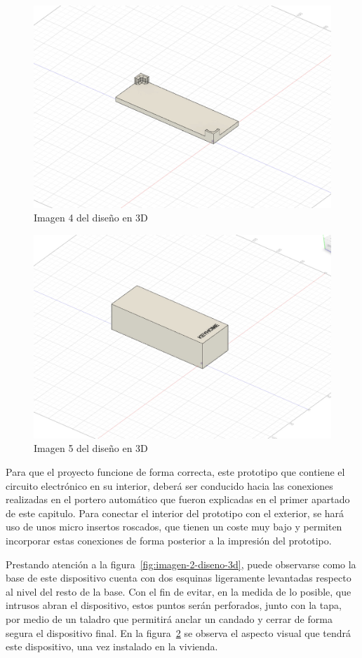 \begin{figure}[tbp]
\centering
\includegraphics[scale = 0.2]{fig/Imagen_4_diseno_3D.jpeg}
\caption{Imagen 4 del diseño en 3D}
\label{fig:imagen-4-diseno-3d}
\end{figure}

\begin{figure}[tbp]
\centering
\includegraphics[scale = 0.2]{fig/Imagen_5_diseno_3D.jpeg}
\caption{Imagen 5 del diseño en 3D}
\label{fig:imagen-5-diseno-3d}
\end{figure}

Para que el proyecto funcione de forma correcta, este prototipo que contiene el circuito electrónico en su interior, deberá ser conducido hacia las conexiones realizadas en el portero automático que fueron explicadas en el primer apartado de este capitulo. Para conectar el interior del prototipo con el exterior, se hará uso de unos micro insertos roscados, que tienen un coste muy bajo y permiten incorporar estas conexiones de forma posterior a la impresión del prototipo.

Prestando atención a la figura~\ref{fig:imagen-2-diseno-3d}, puede observarse como la base de este dispositivo cuenta con dos esquinas ligeramente levantadas respecto al nivel del resto de la base. Con el fin de evitar, en la medida de lo posible, que intrusos abran el dispositivo, estos puntos serán perforados, junto con la tapa, por medio de un taladro que permitirá anclar un candado y cerrar de forma segura el dispositivo final. En la figura~\ref{fig:imagen-5-diseno-3d} se observa el aspecto visual que tendrá este dispositivo, una vez instalado en la vivienda.